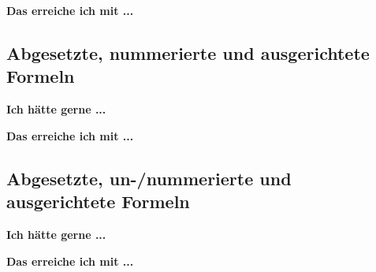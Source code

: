 \documentclass[twoside, 
               a4paper, 
              10pt, 
               parskip=full, 
               sectionentrydots=true, 
               listof=totoc, 
               listof=entryprefix,
               numbers=endperiod]{scrartcl}
\begin{document}
\newpage
{\textbf {Das erreiche ich mit ...}}
 
\begin{miniSeite}[colbacktitle=black!35!white,title=\LaTeX-Code]

\end{miniSeite}




\newpage
\subsection{Abgesetzte, nummerierte und ausgerichtete Formeln}
{\textbf {Ich hätte gerne ...}}
 
\begin{miniSeite}[colbacktitle=black!35!white,title=Ausdruck]

\end{miniSeite}


\newpage
{\textbf {Das erreiche ich mit ...}}
 
\begin{miniSeite}[colbacktitle=black!35!white,title=\LaTeX-Code]

\end{miniSeite}




\newpage
\subsection{Abgesetzte, un-/nummerierte und ausgerichtete Formeln}
{\textbf {Ich hätte gerne ...}}
 
\begin{miniSeite}[colbacktitle=black!35!white,title=Ausdruck]

\end{miniSeite}


\newpage
{\textbf {Das erreiche ich mit ...}}
 
\begin{miniSeite}[colbacktitle=black!35!white,title=\LaTeX-Code]

\end{miniSeite}

\end{document}
